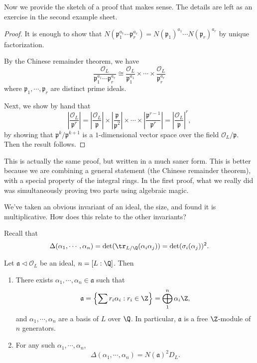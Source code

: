 \documentclass[a4paper]{article}
\begin{document}
Now we provide the sketch of a proof that makes sense. The details are left as an exercise in the second example sheet.
\begin{proof}
  It is enough to show that $N(\mathfrak{p}_1^{a_1} \cdots \mathfrak{p}_r^{a_r}) = N(\mathfrak{p}_1)^{a_1} \cdots N(\mathfrak{p}_r)^{a_r}$ by unique factorization.

  By the Chinese remainder theorem, we have
  \[
    \frac{\mathcal{O}_L}{\mathfrak{p}_1^{a_1} \cdots \mathfrak{p}_r^{a_r}} \cong \frac{\mathcal{O}_L}{\mathfrak{p}_1^{a_1}} \times \cdots \times \frac{\mathcal{O}_L}{\mathfrak{p}_r^{a_r}}
  \]
  where $\mathfrak{p}_1, \cdots, \mathfrak{p}_r$ are distinct prime ideals.

  Next, we show by hand that
  \[
    \left|\frac{\mathcal{O}_L}{\mathfrak{p}^r}\right| = \left|\frac{\mathcal{O}_L}{\mathfrak{p}}\right| \times \left|\frac{\mathfrak{p}}{\mathfrak{p}^2}\right| \times \cdots \times \left|\frac{\mathfrak{p}^{r - 1}}{\mathfrak{p}^r}\right| = \left|\frac{\mathcal{O}_L}{\mathfrak{p}}\right|^r,
  \]
  by showing that $\mathfrak{p}^k/\mathfrak{p}^{k + 1}$ is a $1$-dimensional vector space over the field $\mathcal{O}_L/\mathfrak{p}$. Then the result follows. %
\end{proof}
This is actually the same proof, but written in a much saner form. This is better because we are combining a general statement (the Chinese remainder theorem), with a special property of the integral rings. In the first proof, what we really did was simultaneously proving two parts using algebraic magic.

We've taken an obvious invariant of an ideal, the size, and found it is multiplicative. How does this relate to the other invariants?

Recall that
\[
  \Delta(\alpha_1, \cdots, \alpha_n) = \det(\tr_{L/\Q}(\alpha_i\alpha_j)) = \det(\sigma_i(\alpha_j))^2.
\]
\begin{prop}
  Let $\mathfrak{a} \lhd \mathcal{O}_L$ be an ideal, $n = [L:\Q]$. Then
  \begin{enumerate}
    \item There exists $\alpha_1, \cdots, \alpha_n \in \mathfrak{a}$ such that
      \[
        \mathfrak{a} = \left\{ \sum r_i \alpha_i : r_i \in \Z\right\} = \bigoplus_{1}^n \alpha_i\Z,
      \]
      and $\alpha_1, \cdots, \alpha_n$ are a basis of $L$ over $\Q$. In particular, $\mathfrak{a}$ is a free $\Z$-module of $n$ generators.
    \item For any such $\alpha_1, \cdots, \alpha_n$,
      \[
        \Delta (\alpha_1, \cdots, \alpha_n) = N(\mathfrak{a})^2 D_L.
      \]
  \end{enumerate}
\end{prop}
\end{document}
